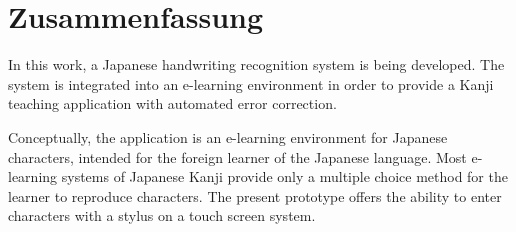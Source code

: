 


\chapter*{Zusammenfassung}
\label{chap:zusammenfassung}

In this work, a Japanese handwriting recognition system is being developed.
The system is integrated into an e-learning environment in order to provide 
a Kanji teaching application with automated error correction.

Conceptually, the application is an e-learning environment for Japanese 
characters, intended for the foreign learner of the Japanese language. 
Most e-learning systems of Japanese Kanji provide only a multiple choice method
for the learner to reproduce characters. The present prototype offers the
ability to enter characters with a stylus on a touch screen system.


